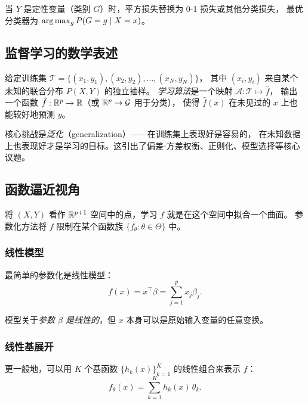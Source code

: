 当 $Y$ 是定性变量（类别 $G$）时，平方损失替换为 0-1 损失或其他分类损失，
最优分类器为 $\arg\max_g P(G = g \mid X = x)$。

\subsection{监督学习的数学表述}

\begin{definition}[监督学习]
给定训练集 $\mathcal{T} = \{(x_1, y_1), (x_2, y_2), \dots, (x_N, y_N)\}$，
其中 $(x_i, y_i)$ 来自某个未知的联合分布 $P(X, Y)$ 的独立抽样。
\emph{学习算法}是一个映射 $\mathcal{A}: \mathcal{T} \mapsto \hat{f}$，
输出一个函数 $\hat{f}: \mathbb{R}^p \to \mathbb{R}$（或 $\mathbb{R}^p \to \mathcal{G}$ 用于分类），
使得 $\hat{f}(x)$ 在未见过的 $x$ 上也能较好地预测 $y$。
\end{definition}

核心挑战是\emph{泛化}（generalization）——在训练集上表现好是容易的，
在未知数据上也表现好才是学习的目标。这引出了偏差-方差权衡、正则化、模型选择等核心议题。

\subsection{函数逼近视角}

将 $(X, Y)$ 看作 $\mathbb{R}^{p+1}$ 空间中的点，学习 $f$ 就是在这个空间中拟合一个曲面。
参数化方法将 $f$ 限制在某个函数族 $\{f_\theta : \theta \in \Theta\}$ 中。

\subsubsection{线性模型}

最简单的参数化是线性模型：
\begin{equation}\label{eq:linear-model}
    f(x) = x^\top \beta = \sum_{j=1}^{p} x_j \beta_j.
\end{equation}

模型关于\emph{参数 $\beta$ 是线性的}，但 $x$ 本身可以是原始输入变量的任意变换。

\subsubsection{线性基展开}

更一般地，可以用 $K$ 个基函数 $\{h_k(x)\}_{k=1}^K$ 的线性组合来表示 $f$：
\begin{equation}\label{eq:basis-expansion}
    f_\theta(x) = \sum_{k=1}^{K} h_k(x)\,\theta_k.
\end{equation}

